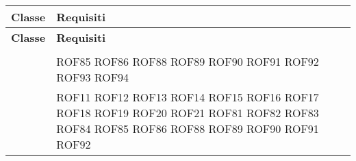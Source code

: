 \documentclass[../DefinizioneDiProdotto_v2.0.0.tex]{subfiles}
\begin{document}
\begin{longtable}{p{8.5cm}!{\VRule[1pt]}p{2.5cm}}
	\color{white} \textbf{Classe}                                                                               & \color{white} \textbf{Requisiti} \\
	\endfirsthead
	\color{white} \textbf{Classe}                                                                               & \color{white} \textbf{Requisiti} \\
	\endhead
	                                                                             &                                  \\
	                                                              & ROF85 \newline
	ROF86 \newline
	ROF88 \newline
	ROF89 \newline
	ROF90 \newline
	ROF91 \newline
	ROF92 \newline
	ROF93 \newline
	ROF94 \\
	                                                                  & 	ROF11 \newline
	ROF12 \newline
	ROF13 \newline
	ROF14 \newline
	ROF15 \newline
	ROF16 \newline
	ROF17 \newline
	ROF18 \newline
	ROF19 \newline
	ROF20 \newline
	ROF21 \newline
	ROF81 \newline
	ROF82 \newline
	ROF83 \newline
	ROF84 \newline
	ROF85 \newline
	ROF86 \newline
	ROF88 \newline
	ROF89 \newline
	ROF90 \newline
	ROF91 \newline
	ROF92 \newline

\end{longtable}
\end{document}
